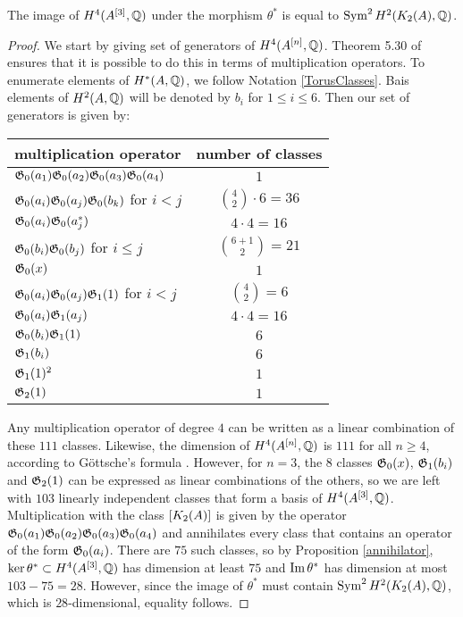 \begin{proposition}\label{ImSym}
The image of $H^4(A^{[3]},\mathbb{Q})$ under the morphism $\theta^*$ is equal to $\operatorname{Sym}^2H^2(K_{ 2 }( A ),\mathbb{Q})$.
\end{proposition}
\begin{proof}
We start by giving set of generators of $H^4(A^{[n]},\mathbb{Q})$. Theorem 5.30 of \cite{LiQinWang} ensures that it is possible to do this in terms of multiplication operators. To enumerate elements of $H^*(A,\mathbb{Q})$, we follow Notation \ref{TorusClasses}. Bais elements of $H^2(A,\mathbb{Q})$ will be denoted by $b_i$ for $1\leq i\leq 6$. Then our set of generators is given by:
\begin{center}
\begin{tabular}{l|c}
multiplication operator & number of classes \\ \hline
$\mathfrak{G}_0(a_1)\mathfrak{G}_0(a_2)\mathfrak{G}_0(a_3)\mathfrak{G}_0(a_4) $  & $1$ \\
$\mathfrak{G}_0(a_i)\mathfrak{G}_0(a_j)\mathfrak{G}_0(b_k)$ for $i<j$  & $\binom{4}{2}\cdot 6 = 36$ \\
$\mathfrak{G}_0(a_i)\mathfrak{G}_0(a_j^*)$ & $4\cdot 4 = 16$ \\
$\mathfrak{G}_0(b_i)\mathfrak{G}_0(b_j)$ for $i\leq j$& $\binom{6+1}{2}= 21$ \\
$\mathfrak{G}_0(x)$ &  $1$  \\ \hline
$\mathfrak{G}_0(a_i)\mathfrak{G}_0(a_j)\mathfrak{G}_1(1)$ for $i<j$ & $\binom{4}{2} = 6$ \\
$\mathfrak{G}_0(a_i)\mathfrak{G}_1(a_j)$ & $4\cdot 4=16$ \\
$\mathfrak{G}_0(b_i)\mathfrak{G}_1(1)$ & $6$ \\
$\mathfrak{G}_1(b_i)$ & $6$ \\
$\mathfrak{G}_1(1)^2 $ & $1$ \\ \hline
$\mathfrak{G}_2(1) $ &$1$
\end{tabular}
\end{center}
Any multiplication operator of degree $4$ can be written as a linear combination of these $111$ classes. Likewise, the dimension of $H^4(A^{[n]},\mathbb{Q})$ is $111$ for all $n\geq 4$, according to G\"ottsche's formula \cite{Gottsche}. However, for $n=3$, the $8$ classes $\mathfrak{G}_0(x)$, $\mathfrak{G}_1(b_i)$ and $\mathfrak{G}_2(1) $ can be expressed as linear combinations of the others, so we are left with $103$ linearly independent classes that form a basis of $H^4(A^{[3]},\mathbb{Q})$. Multiplication with the class $[K_{ 2 }( A )]$ is given by the operator $\mathfrak{G}_0(a_1)\mathfrak{G}_0(a_2)\mathfrak{G}_0(a_3)\mathfrak{G}_0(a_4) $ and annihilates every class that contains an operator of the form $\mathfrak{G}_0(a_i)$. There are $75$ such classes, so by Proposition \ref{annihilator}, $\ker \theta^*\subset H^4(A^{[3]},\mathbb{Q})$ has dimension at least $75$ and $\operatorname{Im}\theta^*$ has dimension at most $103-75=28$. However, since the image of $\theta^*$ must contain $\operatorname{Sym}^2H^2(K_{ 2 }( A ),\mathbb{Q})$, which is $28$-dimensional, equality follows.
\end{proof}


